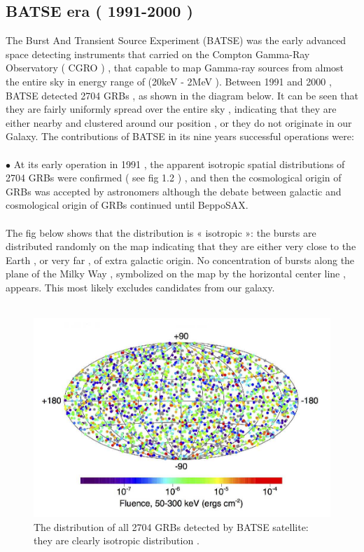 \subsection{BATSE era ( 1991-2000 )}
The  Burst  And Transient  Source  Experiment (BATSE) was the early advanced space detecting  instruments that  carried  on the Compton Gamma-Ray Observatory ( CGRO ) , that  capable to  map  Gamma-ray  sources  from  almost the  entire sky in  energy range of (20keV - 2MeV ). Between  1991  and  2000 , BATSE  detected   2704  GRBs , as shown in the  diagram  below. It can be seen that they are fairly uniformly spread over the entire  sky , indicating  that they  are  either  nearby  and  clustered around our position , or  they  do  not  originate  in  our  Galaxy. The  contributions of BATSE in its  nine years  successful  operations  were:\\\\
$\bullet$ At  its  early  operation  in  1991 , the  apparent isotropic  spatial distributions  of 2704  GRBs  were  confirmed ( see fig 1.2 ) , and  then the cosmological  origin  of  GRBs  was  accepted  by  astronomers  although the debate between  galactic  and  cosmological  origin  of  GRBs  continued  until BeppoSAX. \citep{5} \citep{7} \\\\
The fig below shows that the  distribution is « isotropic »: the bursts are distributed randomly on the map indicating that they are either very close to the Earth , or very far  , of extra galactic origin. No concentration of bursts along the plane of the Milky Way , symbolized on the map by the horizontal center line , appears. This most likely excludes candidates from our galaxy.\\\\
\begin{figure}[h]
\begin{center}
\includegraphics[scale=0.4]{Figures/fig2.png}
\caption{The distribution of all 2704 GRBs detected by BATSE satellite: they are clearly isotropic distribution .\citep{7}}
\end{center}
\end{figure}
